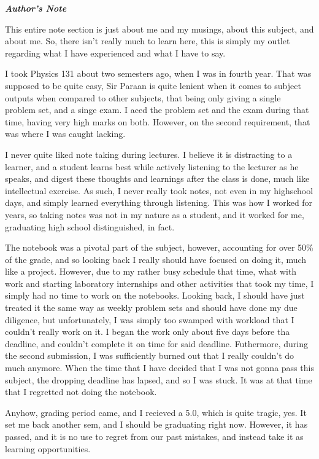 {
	\LARGE
	\flushleft \textit{\textbf{Author's Note}}
}
\vspace{1cm}

This entire note section is just about me and my musings, about this subject, and about me.
So, there isn't really much to learn here, this is simply my outlet regarding
what I have experienced and what I have to say.

I took Physics 131 about two semesters ago, when I was in fourth year. That was supposed
to be quite easy, Sir Paraan is quite lenient when it comes to subject outputs when compared
to other subjects, that being only giving a single problem set, and a singe exam. 
I aced the problem set and the exam during that time, having very high marks on both. However,
on the second requirement, that was where I was caught lacking. 

I never quite liked note taking during lectures. I believe it is distracting to a learner, and 
a student learns best while actively listening to the lecturer as he speaks, and digest these 
thoughts and learnings after the class is done, much like intellectual exercise.
As such, I never really took notes, not even in my highschool days, and simply learned everything 
through listening. This was how I worked 
for years, so taking notes was not in my nature as a student, and it worked for me, graduating 
high school distinguished, in fact.

The notebook was a pivotal
part of the subject, however, accounting for over 50\% of the grade, and so looking back
I really should have focused on doing it, much like a project. However, due to my rather
busy schedule that time, what with work and starting laboratory internships and other 
activities that took my time, I simply had no time to work on the notebooks. Looking back,
I should have just treated it the same way as weekly problem sets and should have done
my due diligence, but unfortunately, I was simply too swamped with workload that I couldn't
really work on it. I began the work only about five days before tha deadline, and couldn't 
complete it on time for said deadline. Futhermore, during the second submission, I was 
sufficiently burned out that I really couldn't do much anymore. When the time that I have
decided that I was not gonna pass this subject, the dropping deadline has lapsed, and so
I was stuck. It was at that time that I regretted not doing the notebook.

Anyhow, grading period came, and I recieved a 5.0, which is quite tragic, yes. It set me 
back another sem, and I should be graduating right now. However, it has passed, and it is 
no use to regret from our past mistakes, and instead take it as learning opportunities.

